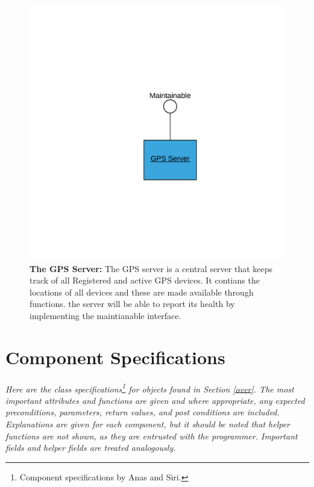 \documentclass[12pt]{article}
\begin{document}
\begin{figure}[H]
    \centerline{\includegraphics[scale=.20]{GPSServer.png}}
    \caption{\textbf{The GPS Server: }The GPS server is a central server that keeps track of all Registered and active GPS devices. 
It contians the locations of all devices and these are made available through functions. the server will be able 
to report its health by implementing the maintianable interface.}
    \label{fig:GPSServer}
\end{figure}   

\section{Component Specifications}
\paragraph{} \textit{Here are the class specifications\footnote{Component specifications by Anas and Siri.} for objects 
found in Section \ref{over}. The most important attributes and functions are given and where appropriate, any expected 
preconditions, parameters, return values, and post conditions are included. Explanations are given for each component, but 
it should be noted that helper functions are not shown, as they are entrusted with the programmer. Important fields and helper
fields are treated analogously.}
\end{document}
